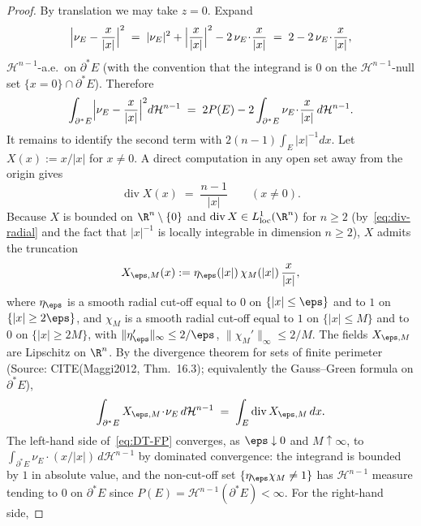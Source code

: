 \begin{proof}
By translation we may take $z=0$. Expand
\begin{equation}\label{eq:expand-square}
   \Bigl|\nu_E-\frac{x}{|x|}\Bigr|^2
   \;=\;|\nu_E|^2+\Bigl|\frac{x}{|x|}\Bigr|^2-2\,\nu_E\!\cdot\!\frac{x}{|x|}
   \;=\;2-2\,\nu_E\!\cdot\!\frac{x}{|x|},
\end{equation}
$\mathcal H^{n-1}$-a.e.\ on $\partial^*E$ (with the convention that the
integrand is $0$ on the $\mathcal H^{n-1}$-null set
$\{x=0\}\cap\partial^*E$). Therefore
\begin{equation}\label{eq:half-step}
   \int_{\partial^*E}
   \Bigl|\nu_E-\frac{x}{|x|}\Bigr|^2 d\mathcal H^{n-1}
   \;=\;
   2P(E)-2\int_{\partial^*E}\nu_E\!\cdot\!\frac{x}{|x|}\,d\mathcal H^{n-1}.
\end{equation}
It remains to identify the second term with
$2(n-1)\!\int_E|x|^{-1}dx$. Let $X(x):=x/|x|$ for $x\ne 0$. A direct
computation in any open set away from the origin gives
\begin{equation}\label{eq:div-radial}
   \operatorname{div}X(x)\;=\;\frac{n-1}{|x|}\qquad(x\ne 0).
\end{equation}
Because $X$ is bounded on $\R^n\setminus\{0\}$ and
$\operatorname{div}X\in L^1_{\mathrm{loc}}(\R^n)$ for $n\ge 2$
(by~\eqref{eq:div-radial} and the fact that $|x|^{-1}$ is locally
integrable in dimension $n\ge 2$), $X$ admits the truncation
\[
   X_{\eps,M}(x):=\eta_\eps(|x|)\,\chi_M(|x|)\,\frac{x}{|x|},
\]
where $\eta_\eps$ is a smooth radial cut-off equal to $0$ on
$\{|x|\le\eps\}$ and to $1$ on $\{|x|\ge 2\eps\}$, and $\chi_M$ is a
smooth radial cut-off equal to $1$ on $\{|x|\le M\}$ and to $0$ on
$\{|x|\ge 2M\}$, with $\|\eta_\eps'\|_\infty\le 2/\eps$,
$\|\chi_M'\|_\infty\le 2/M$. The fields $X_{\eps,M}$ are Lipschitz on
$\R^n$. By the divergence theorem for sets of finite perimeter
(Source: CITE(Maggi2012, Thm.~16.3); equivalently the
Gauss--Green formula on $\partial^*E$),
\begin{equation}\label{eq:DT-FP}
   \int_{\partial^*E} X_{\eps,M}\!\cdot\!\nu_E\,d\mathcal H^{n-1}
   \;=\;\int_E\operatorname{div}X_{\eps,M}\,dx.
\end{equation}
The left-hand side of~\eqref{eq:DT-FP} converges, as
$\eps\downarrow 0$ and $M\uparrow\infty$, to
$\int_{\partial^*E}\nu_E\cdot(x/|x|)\,d\mathcal H^{n-1}$ by dominated
convergence: the integrand is bounded by $1$ in absolute value, and the
non-cut-off set $\{\eta_\eps\chi_M\ne 1\}$ has $\mathcal H^{n-1}$
measure tending to $0$ on $\partial^*E$ since
$P(E)=\mathcal H^{n-1}(\partial^*E)<\infty$. For the right-hand side,

\end{proof}
